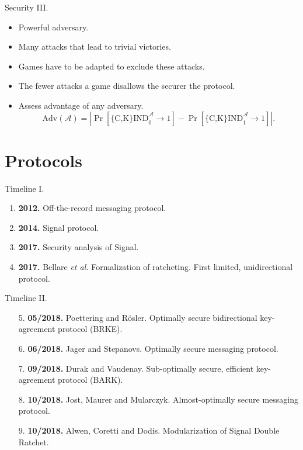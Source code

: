 \documentclass{beamer}
\renewcommand{\t}{\text}
\begin{document}
\begin{frame}{Security III.}
  \begin{itemize}
  \item Powerful adversary.
  \item Many attacks that lead to trivial victories.
  \item Games have to be adapted to exclude these attacks.
  \item The fewer attacks a game disallows the securer the protocol.
  \item Assess advantage of any adversary.
\[
  \t{Adv}(\mathcal{A}) = \left| \Pr \left[ \t{\{C,K\}IND}_0^\mathcal{A} \rightarrow 1 \right] -
                                \Pr \left[ \t{\{C,K\}IND}_1^\mathcal{A} \rightarrow 1 \right]
                         \right|.
\]
  \end{itemize}
\end{frame}

\section{Protocols}
\label{sec:protocols}

\begin{frame}{Timeline I.}
  \begin{enumerate}
  \item \textbf{2012.} Off-the-record messaging protocol.
  \item \textbf{2014.} Signal protocol.
  \item \textbf{2017.} Security analysis of Signal.
  \item \textbf{2017.} Bellare {\em et al.} Formalization of ratcheting. First
    limited, unidirectional protocol.
  \end{enumerate}
\end{frame}

\begin{frame}{Timeline II.}
  \begin{enumerate}
  \item[5.] \textbf{05/2018.} Poettering and Rösler. Optimally secure bidirectional
    key-agreement protocol (BRKE).
  \item[6.] \textbf{06/2018.} Jager and Stepanovs. Optimally secure messaging protocol.
  \item[7.] \textbf{09/2018.} Durak and Vaudenay. Sub-optimally secure, efficient key-agreement
    protocol (BARK).
  \item[8.] \textbf{10/2018.} Jost, Maurer and Mularczyk. Almost-optimally secure messaging
    protocol.
  \item[9.] \textbf{10/2018.} Alwen, Coretti and Dodis. Modularization of Signal Double
    Ratchet.
  \end{enumerate}
\end{frame}
\end{document}
